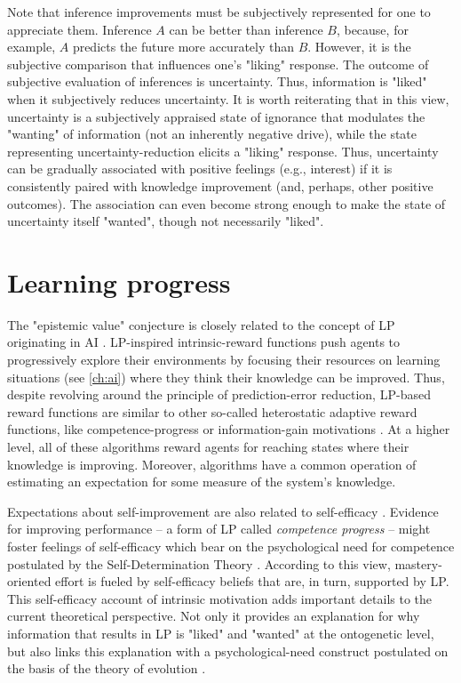 Note that inference improvements must be subjectively represented for one to appreciate them. Inference $A$ can be better than inference $B$, because, for example, $A$ predicts the future more accurately than $B$. However, it is the subjective comparison that influences one's "liking" response. The outcome of subjective evaluation of inferences is uncertainty. Thus, information is "liked" when it subjectively reduces uncertainty. It is worth reiterating that in this view, uncertainty is a subjectively appraised state of ignorance that modulates the "wanting" of information (not an inherently negative drive), while the state representing uncertainty-reduction elicits a "liking" response. Thus, uncertainty can be gradually associated with positive feelings (e.g., interest) if it is consistently paired with knowledge improvement (and, perhaps, other positive outcomes). The association can even become strong enough to make the state of uncertainty itself "wanted", though not necessarily "liked".

\section{Learning progress}\label{CH2_S_learning_progress}

The "epistemic value" conjecture is closely related to the concept of \ac{LP} originating in \ac{AI} \parencite[e.g., ][]{schmidhuber_curious_1991,oudeyer_intrinsic_2007}. \ac{LP}-inspired intrinsic-reward functions push agents to progressively explore their environments by focusing their resources on learning situations (see \autoref{ch:ai}) where they think their knowledge can be improved. Thus, despite revolving around the principle of prediction-error reduction, \ac{LP}-based reward functions are similar to other so-called heterostatic adaptive reward functions, like competence-progress or information-gain motivations \parencite{oudeyer_what_2007}. At a higher level, all of these algorithms reward agents for reaching states where their knowledge is improving. Moreover,  algorithms have a common operation of estimating an expectation for some measure of the system's knowledge. 

Expectations about self-improvement are also related to self-efficacy \parencite{bandura_self-efficacy_1977}. Evidence for improving performance  -- a form of \ac{LP} called \emph{competence progress} \parencite[see ][]{oudeyer_what_2007} -- might foster feelings of self-efficacy which bear on the psychological need for competence \parencite{blain_intrinsic_2021} postulated by the Self-Determination Theory \parencite{ryan_self-determination_2000}. According to this view, mastery-oriented effort is fueled by self-efficacy beliefs that are, in turn, supported by \ac{LP}. This self-efficacy account of intrinsic motivation adds important details to the current theoretical perspective. Not only it provides an explanation for why information that results in \ac{LP} is "liked" and "wanted" at the ontogenetic level, but also links this explanation with a psychological-need construct postulated on the basis of the theory of evolution \parencite{ryan_self-determination_2017}. 

